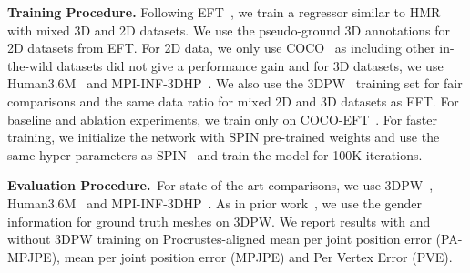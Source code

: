 \documentclass[10pt,twocolumn,letterpaper]{article}
\begin{document}
\textbf{Training Procedure.} Following EFT~\cite{eft}, we train a regressor similar to HMR \cite{hmr} with mixed 3D and 2D datasets. We use the pseudo-ground 3D annotations for 2D datasets from EFT. For 2D data, we only use COCO~\cite{coco} as including other in-the-wild datasets did not give a performance gain and for 3D datasets, we use Human3.6M~\cite{h36m_pami} and  MPI-INF-3DHP~\cite{Mehta2017Monocular3H}. We also use the 3DPW~\cite{vonMarcard2018} training set for fair comparisons and the same data ratio for mixed 2D and 3D datasets as EFT. For baseline and ablation experiments, we train only on COCO-EFT~\cite{eft}. For faster training, we initialize the network with SPIN pre-trained weights and use the same hyper-parameters as SPIN~\cite{spin} and train the model for 100K iterations.

\textbf{Evaluation Procedure.}~For state-of-the-art comparisons, we use 3DPW~\cite{Li20143DHP}, Human3.6M~\cite{h36m_pami} and MPI-INF-3DHP~\cite{Mehta2017Monocular3H}. As in prior work~\cite{eft, spin}, we use the gender information for ground truth meshes on 3DPW. We report results with and without 3DPW training on Procrustes-aligned mean per joint position error (PA-MPJPE), mean per joint position error (MPJPE) and Per Vertex Error (PVE). 
\end{document}
